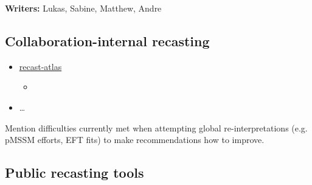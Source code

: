 \documentclass[11pt]{article}
\begin{document}
\noindent\textbf{Writers:} Lukas, Sabine, Matthew, Andre\\





\subsection{Collaboration-internal recasting}


\begin{itemize}
    \item \href{https://github.com/recast-hep/recast-atlas}{recast-atlas}
        \begin{itemize}
            \item {}
        \end{itemize}
    \item \ldots
\end{itemize}

Mention difficulties currently met when attempting global re-interpretations (e.g. pMSSM efforts, EFT fits) to make recommendations how to improve.


\subsection{Public recasting tools}
\end{document}
